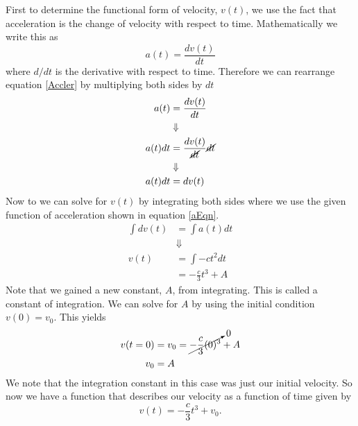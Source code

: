 \documentclass[11pt]{article}
\begin{document}
First to determine the functional form of velocity, $v(t)$, we use the fact that acceleration
is the change of velocity with respect to time. Mathematically we write this as
\begin{equation}
a(t) = \frac{dv(t)}{dt}
\label{Accler}
\end{equation}
where $d/dt$ is the derivative with respect to time. Therefore we can rearrange equation
\ref{Accler} by multiplying both sides by $dt$
\begin{align*}
a(t) &= \frac{dv(t)}{dt}\\
&\Downarrow\\
a(t)dt &= \frac{dv(t)}{\cancel{dt}}\cancel{dt}\\
&\Downarrow\\
a(t)dt &= dv(t)
\end{align*}
Now to we can solve for $v(t)$ by integrating both sides where we use the given function of 
acceleration shown in equation \ref{aEqn}.
\begin{align*}
\int dv(t) &= \int a(t)dt \\
&\Downarrow\\
v(t) &= \int -ct^2dt \\
&= -\frac{c}{3}t^3 + A
\end{align*}
Note that we gained a new constant, $A$, from integrating. This is called a constant of 
integration. We can solve for $A$ by using the initial condition $v(0) = v_0$. This yields
\begin{align*}
v(t=0) &= v_0 = \cancelto{0}{-\frac{c}{3}(0)^3} + A\\
v_0 &= A
\end{align*}
We note that the integration constant in this case was just our initial velocity. So now we
have a function that describes our velocity as a function of time given by
\begin{equation}
v(t) = -\frac{c}{3}t^3 + v_0.
\label{vEqn}
\end{equation}
\end{document}
